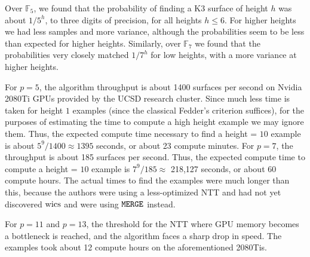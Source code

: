 Over \(\mathbb{F}_{5}\), we 
found that the probability of finding a K3 surface
of height \(h\) was about \(1 / 5^{h}\), to three digits
of precision, for all heights \(h \leq 6\).
For higher heights we had less samples
and more variance, although
the probabilities seem to be less than expected
for higher heights.
Similarly, over \(\mathbb{F}_{7}\) we found that
the probabilities very closely matched \(1 / 7^{h}\) 
for low heights, with a more variance at higher heights.

For \(p=5\), the algorithm throughput is about
1400 surfaces per second on 
Nvidia 2080Ti GPUs provided by the 
UCSD research cluster.
Since much less time is taken for height \(1\) examples
(since the classical Fedder's criterion suffices), 
for the purposes of estimating the time to compute a
high height example we may ignore them.
Thus,
the expected compute time necessary to find a height = \(10\) 
example is about  \(5^{9} / 1400 \approx 1395\) seconds, or about 
23 compute minutes.
For \(p=7\), the throughput is about 185 surfaces
per second.
Thus, the expected compute time to compute
a height = \(10\) example is 
\(7^{9} / 185 \approx \) 218,127 seconds, or about 
60 compute hours.
The actual times to find the examples were much 
longer than this, because the authors were using a 
less-optimized NTT and had not yet discovered \(\wics\) 
and were using \(\merge\) instead.

For $p = 11$ and $p = 13$, the threshold for the NTT where 
GPU memory becomes a bottleneck is reached, and the algorithm 
faces a sharp drop in speed. The examples took about 12 compute hours
on the aforementioned 2080Tis.

